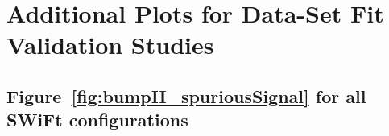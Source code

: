 \chapter{Additional Plots for \lm{} Data-Set Fit Validation Studies}
\label{app:lowMass_Swift}
\vspace{-3em}

\section{Figure~\ref{fig:bumpH_spuriousSignal} for all SWiFt configurations}

